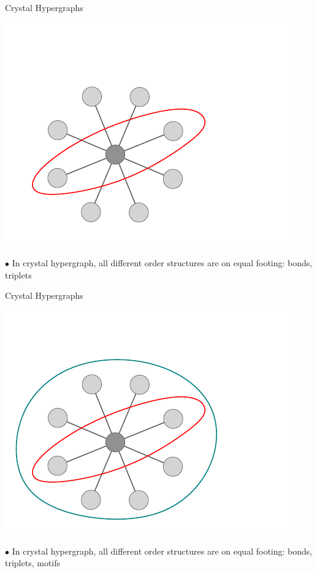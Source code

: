 \documentclass[11pt]{beamer}
\begin{document}
\begin{frame}{Crystal Hypergraphs}


\begin{center}
\includegraphics[scale=0.7]{hypergraph_2.pdf}
\end{center}
\vspace{.5cm}

\medskip

$\bullet$ In crystal hypergraph, all different order structures are on equal footing: bonds, triplets

\end{frame}
\begin{frame}{Crystal Hypergraphs}


\begin{center}
\includegraphics[scale=0.7]{hypergraph_3.pdf}
\end{center}
\vspace{.5cm}

\medskip

$\bullet$ In crystal hypergraph, all different order structures are on equal footing: bonds, triplets, motifs

\end{frame}
\end{document}
